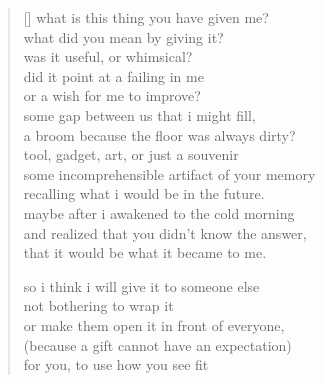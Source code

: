 
\settowidth{}
\begin{verse}[\versewidth]
what is this thing you have given me? \\
what did you mean by giving it? \\
was it useful, or whimsical? \\
did it point at a failing in me \\
or a wish for me to improve? \\
some gap between us that i might fill, \\
a broom because the floor was always dirty? \\
tool, gadget, art, or just a souvenir \\
some incomprehensible artifact of your memory \\
recalling what i would be in the future. \\
maybe after i awakened to the cold morning \\
and realized that you didn't know the answer, \\
that it would be what it became to me.

so i think i will give it to someone else \\
not bothering to wrap it  \\
or make them open it in front of everyone, \\
(because a gift cannot have an expectation) \\
for you, to use how you see fit
\end{verse}

